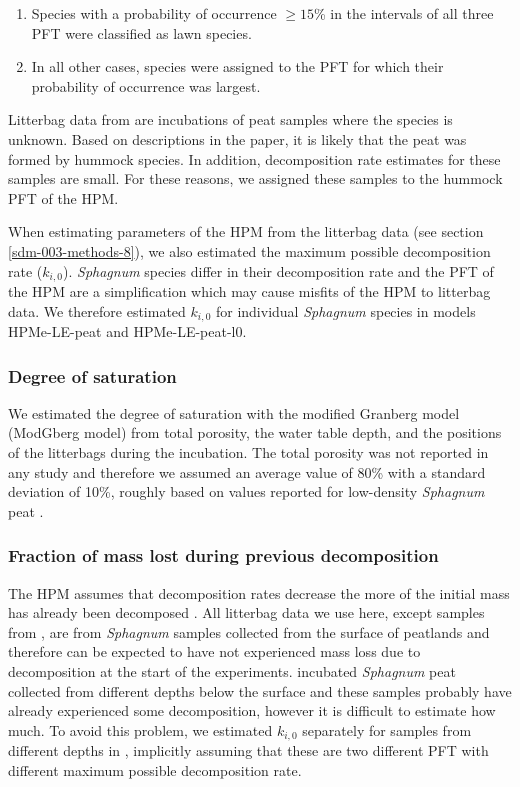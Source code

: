 \documentclass[esd, manuscript]{copernicus}
\begin{document}
\begin{enumerate}
\def\labelenumi{\arabic{enumi}.}
\item
  Species with a probability of occurrence \(\ge15\)\% in the intervals of all three PFT were classified as lawn species.
\item
  In all other cases, species were assigned to the PFT for which their probability of occurrence was largest.
\end{enumerate}

Litterbag data from \citet{Prevost.1997} are incubations of peat samples where the species is unknown. Based on descriptions in the paper, it is likely that the peat was formed by hummock species. In addition, decomposition rate estimates for these samples are small. For these reasons, we assigned these samples to the hummock PFT of the HPM.

When estimating parameters of the HPM from the litterbag data (see section \ref{sdm-003-methods-8}), we also estimated the maximum possible decomposition rate (\(k_{i,0}\)). \emph{Sphagnum} species differ in their decomposition rate and the PFT of the HPM are a simplification which may cause misfits of the HPM to litterbag data. We therefore estimated \(k_{i,0}\) for individual \emph{Sphagnum} species in models HPMe-LE-peat and HPMe-LE-peat-l0.

\hypertarget{sdm-003-methods-5}{%
\subsubsection{Degree of saturation}\label{sdm-003-methods-5}}

We estimated the degree of saturation with the modified Granberg model (ModGberg model) \citep{Granberg.1999, Kettridge.2007} from total porosity, the water table depth, and the positions of the litterbags during the incubation. The total porosity was not reported in any study and therefore we assumed an average value of 80\% with a standard deviation of 10\%, roughly based on values reported for low-density \emph{Sphagnum} peat \citep{Liu.2019}.

\hypertarget{sdm-003-methods-6}{%
\subsubsection{Fraction of mass lost during previous decomposition}\label{sdm-003-methods-6}}

The HPM assumes that decomposition rates decrease the more of the initial mass has already been decomposed \citep{Frolking.2001, Frolking.2010}. All litterbag data we use here, except samples from \citet{Prevost.1997}, are from \emph{Sphagnum} samples collected from the surface of peatlands and therefore can be expected to have not experienced mass loss due to decomposition at the start of the experiments. \citet{Prevost.1997} incubated \emph{Sphagnum} peat collected from different depths below the surface and these samples probably have already experienced some decomposition, however it is difficult to estimate how much. To avoid this problem, we estimated \(k_{i,0}\) separately for samples from different depths in \citet{Prevost.1997}, implicitly assuming that these are two different PFT with different maximum possible decomposition rate.
\end{document}
